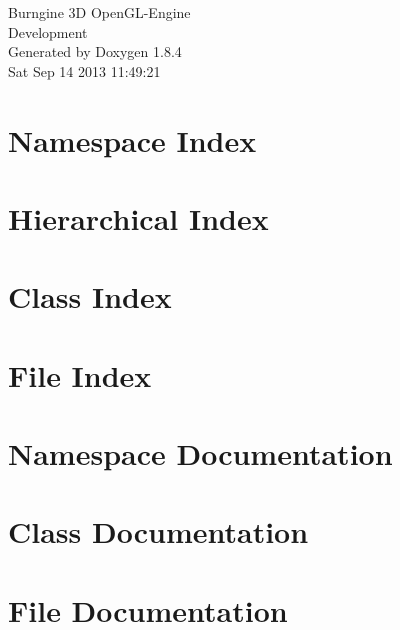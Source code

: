 \documentclass[twoside]{book}
\newcommand{\clearemptydoublepage}{%
  \newpage{\pagestyle{empty}\cleardoublepage}%
}
\begin{document}
\hypersetup{pageanchor=false}
\begin{titlepage}
\vspace*{7cm}
\begin{center}%
{\Large Burngine 3\-D Open\-G\-L-\/\-Engine \\[1ex]\large Development }\\
\vspace*{1cm}
{\large Generated by Doxygen 1.8.4}\\
\vspace*{0.5cm}
{\small Sat Sep 14 2013 11:49:21}\\
\end{center}
\end{titlepage}
\clearemptydoublepage
\tableofcontents
\clearemptydoublepage
{}
\hypersetup{pageanchor=true}

\chapter{Namespace Index}

\chapter{Hierarchical Index}

\chapter{Class Index}

\chapter{File Index}

\chapter{Namespace Documentation}

\chapter{Class Documentation}












\chapter{File Documentation}



























\newpage
{}
{}
\printindex
\end{document}
